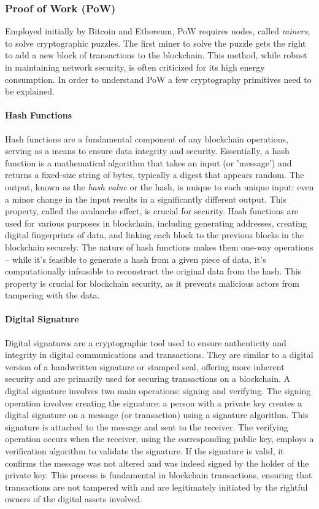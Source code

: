 \subsubsection{Proof of Work (PoW)} 
Employed initially by Bitcoin and Ethereum, PoW requires nodes, called \textit{miners}, to solve cryptographic puzzles. The first miner to solve the puzzle gets the right to add a new block of transactions to the blockchain. This method, while robust in maintaining network security, is often criticized for its high energy consumption. In order to understand PoW a few cryptography primitives need to be explained.


\paragraph{Hash Functions}
Hash functions are a fundamental component of any blockchain operations, serving as a means to ensure data integrity and security. Essentially, a hash function is a mathematical algorithm that takes an input (or 'message') and returns a fixed-size string of bytes, typically a digest that appears random. The output, known as the \textit{hash value} or the hash, is unique to each unique input: even a minor change in the input results in a significantly different output. This property, called the avalanche effect, is crucial for security. Hash functions are used for various purposes in blockchain, including generating addresses, creating digital fingerprints of data, and linking each block to the previous blocks in the blockchain securely. The nature of hash functions makes them one-way operations – while it's feasible to generate a hash from a given piece of data, it's computationally infeasible to reconstruct the original data from the hash. This property is crucial for blockchain security, as it prevents malicious actors from tampering with the data.


\paragraph{Digital Signature}\label{digital_signature}
Digital signatures are a cryptographic tool used to ensure authenticity and integrity in digital communications and transactions. They are similar to a digital version of a handwritten signature or stamped seal, offering more inherent security and are primarily used for securing transactions on a blockchain. A digital signature involves two main operations: signing and verifying. The signing operation involves creating the signature: a person with a private key creates a digital signature on a message (or transaction) using a signature algorithm. This signature is attached to the message and sent to the receiver. The verifying operation occurs when the receiver, using the corresponding public key, employs a verification algorithm to validate the signature. If the signature is valid, it confirms the message was not altered and was indeed signed by the holder of the private key. This process is fundamental in blockchain transactions, ensuring that transactions are not tampered with and are legitimately initiated by the rightful owners of the digital assets involved.


